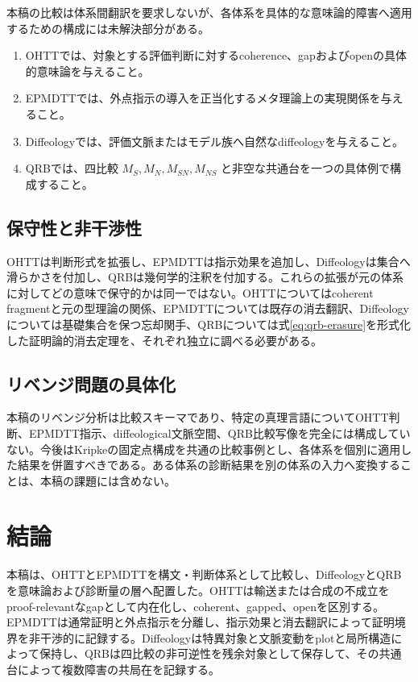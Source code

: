 \documentclass[a4paper,11pt]{ltjsarticle}
\theoremstyle{definition}
\theoremstyle{plain}
\begin{document}
本稿の比較は体系間翻訳を要求しないが、各体系を具体的な意味論的障害へ適用するための構成には未解決部分がある。
\begin{enumerate}
 \item OHTTでは、対象とする評価判断に対するcoherence、gapおよびopenの具体的意味論を与えること。
 \item EPMDTTでは、外点指示の導入を正当化するメタ理論上の実現関係を与えること。
 \item Diffeologyでは、評価文脈またはモデル族へ自然なdiffeologyを与えること。
 \item QRBでは、四比較 $M_S,M_N,M_{SN},M_{NS}$ と非空な共通台を一つの具体例で構成すること。
\end{enumerate}

\subsection{保守性と非干渉性}

OHTTは判断形式を拡張し、EPMDTTは指示効果を追加し、Diffeologyは集合へ滑らかさを付加し、QRBは幾何学的注釈を付加する。これらの拡張が元の体系に対してどの意味で保守的かは同一ではない。OHTTについてはcoherent fragmentと元の型理論の関係、EPMDTTについては既存の消去翻訳、Diffeologyについては基礎集合を保つ忘却関手、QRBについては式\eqref{eq:qrb-erasure}を形式化した証明論的消去定理を、それぞれ独立に調べる必要がある。

\subsection{リベンジ問題の具体化}

本稿のリベンジ分析は比較スキーマであり、特定の真理言語についてOHTT判断、EPMDTT指示、diffeological文脈空間、QRB比較写像を完全には構成していない。今後はKripkeの固定点構成を共通の比較事例とし、各体系を個別に適用した結果を併置すべきである。ある体系の診断結果を別の体系の入力へ変換することは、本稿の課題には含めない。

\section{結論}

本稿は、OHTTとEPMDTTを構文・判断体系として比較し、DiffeologyとQRBを意味論および診断量の層へ配置した。OHTTは輸送または合成の不成立をproof-relevantなgapとして内在化し、coherent、gapped、openを区別する。EPMDTTは通常証明と外点指示を分離し、指示効果と消去翻訳によって証明境界を非干渉的に記録する。Diffeologyは特異対象と文脈変動をplotと局所構造によって保持し、QRBは四比較の非可逆性を残余対象として保存して、その共通台によって複数障害の共局在を記録する。
\end{document}
